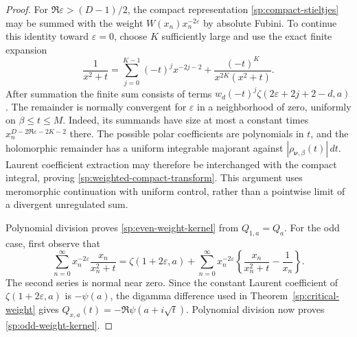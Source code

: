 \begin{proof}
For $\Re\varepsilon>(D-1)/2$, the compact representation
\eqref{sp:compact-stieltjes} may be summed with the weight
$W(x_n)x_n^{-2\varepsilon}$ by absolute Fubini.
To continue this identity toward $\varepsilon=0$, choose $K$
sufficiently large and use the exact finite expansion
\[
 \frac{1}{x^2+t}
 =\sum_{j=0}^{K-1}(-t)^j x^{-2j-2}
       +\frac{(-t)^K}{x^{2K}(x^2+t)}.
\]
After summation the finite sum consists of terms
$w_d(-t)^j\zeta(2\varepsilon+2j+2-d,a)$.
The remainder is normally convergent for $\varepsilon$ in a
neighborhood of zero, uniformly on $\beta\leq t\leq M$.
Indeed, its summands have size at most a constant times
$x_n^{D-2\Re\varepsilon-2K-2}$ there.
The possible polar coefficients are polynomials in $t$, and
the holomorphic remainder has a uniform integrable majorant
against $|\rho_{\boldsymbol\nu,\beta}(t)|\,dt$.
Laurent coefficient extraction may therefore be interchanged
with the compact integral, proving
\eqref{sp:weighted-compact-transform}.  This argument uses
meromorphic continuation with uniform control, rather than a
pointwise limit of a divergent unregulated sum.

Polynomial division proves \eqref{sp:even-weight-kernel} from
$Q_{1,a}=Q_a$.  For the odd case, first observe that
\[
 \sum_{n=0}^{\infty}x_n^{-2\varepsilon}
                \frac{x_n}{x_n^2+t}
 =\zeta(1+2\varepsilon,a)
  +\sum_{n=0}^{\infty}x_n^{-2\varepsilon}
        \left\{\frac{x_n}{x_n^2+t}-\frac1{x_n}\right\}.
\]
The second series is normal near zero.  Since the constant
Laurent coefficient of $\zeta(1+2\varepsilon,a)$ is $-\psi(a)$,
the digamma difference used in
Theorem~\ref{sp:critical-weight} gives
$Q_{x,a}(t)=-\Re\psi(a+i\sqrt t)$.
Polynomial division now proves \eqref{sp:odd-weight-kernel}.
\end{proof}

